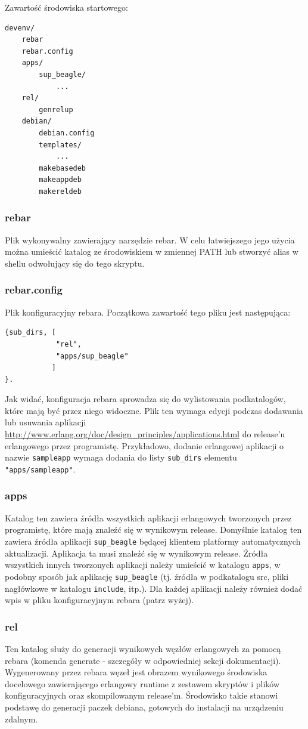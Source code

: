 \documentclass[polish,12pt]{aghthesis}
\begin{document}
Zawartość środowiska startowego:

\begin{lstlisting}
devenv/
    rebar
    rebar.config
    apps/
        sup_beagle/
            ...
    rel/
        genrelup
    debian/
        debian.config
        templates/
            ...
        makebasedeb
        makeappdeb
        makereldeb
\end{lstlisting}

\subsubsection{rebar}
Plik wykonywalny zawierający narzędzie rebar. W celu łatwiejszego jego użycia można umieścić katalog ze środowiskiem w zmiennej PATH lub stworzyć alias w shellu odwołujący się do tego skryptu.
\subsubsection{rebar.config}
Plik konfiguracyjny rebara. Początkowa zawartość tego pliku jest następująca:
\begin{lstlisting}
{sub_dirs, [
            "rel",
            "apps/sup_beagle"
           ]
}.
\end{lstlisting}
Jak widać, konfiguracja rebara sprowadza się do wylistowania podkatalogów, które mają być przez niego widoczne. Plik ten wymaga edycji podczas dodawania lub usuwania aplikacji \url{http://www.erlang.org/doc/design_principles/applications.html} do release'u erlangowego przez programistę. Przykładowo, dodanie erlangowej aplikacji o nazwie \texttt{sampleapp} wymaga dodania do listy \texttt{sub\_dirs} elementu \texttt{"apps/sampleapp"}.
\subsubsection{apps}
Katalog ten zawiera źródła wszystkich aplikacji erlangowych tworzonych przez programistę, które mają znaleźć się w wynikowym release. Domyślnie katalog ten zawiera źródła aplikacji \texttt{sup\_beagle} będącej klientem platformy automatycznych aktualizacji. Aplikacja ta musi znaleźć się w wynikowym release. Źródła wszystkich innych tworzonych aplikacji należy umieścić w katalogu \texttt{apps}, w podobny sposób jak aplikację \texttt{sup\_beagle} (tj. źródła w podkatalogu src, pliki nagłówkowe w katalogu \texttt{include}, itp.). Dla każdej aplikacji należy również dodać wpis w pliku konfiguracyjnym rebara (patrz wyżej).
\subsubsection{rel}
Ten katalog służy do generacji wynikowych węzłów erlangowych za pomocą rebara (komenda generate - szczegóły w odpowiedniej sekcji dokumentacji). Wygenerowany przez rebara węzeł jest obrazem wynikowego środowiska docelowego zawierającego erlangowy runtime z zestawem skryptów i plików konfiguracyjnych oraz skompilowanym release'm. Środowisko takie stanowi podstawę do generacji paczek debiana, gotowych do instalacji na urządzeniu zdalnym.
\end{document}
